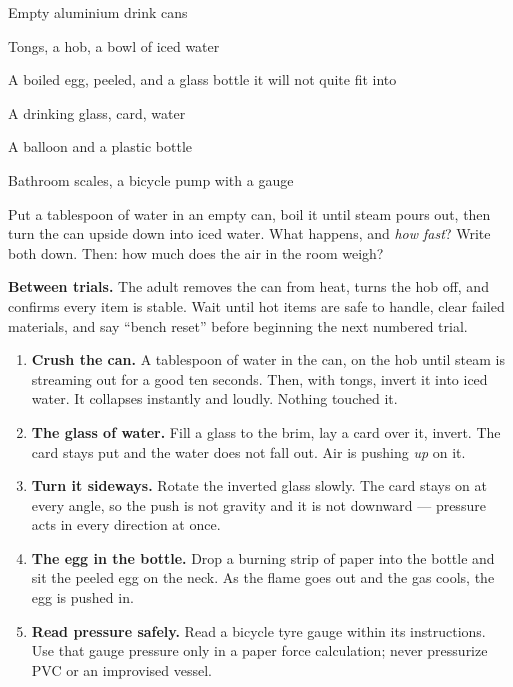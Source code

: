 



\begin{materials}
\item Empty aluminium drink cans
\item Tongs, a hob, a bowl of iced water
\item A boiled egg, peeled, and a glass bottle it will not quite fit into
\item A drinking glass, card, water
\item A balloon and a plastic bottle
\item Bathroom scales, a bicycle pump with a gauge
\end{materials}

\begin{predict}
Put a tablespoon of water in an empty can, boil it until steam pours out, then
turn the can upside down into iced water. What happens, and \emph{how fast}?
Write both down. Then: how much does the air in the room weigh?
\end{predict}
\airplate

\begin{telosframe}
\textbf{Between trials.} The adult removes the can from heat, turns the hob
off, and confirms every item is stable. Wait until hot items are safe to
handle, clear failed materials, and say ``bench reset'' before beginning the
next numbered trial.
\end{telosframe}
\begin{enumerate}
\item \textbf{Crush the can.} A tablespoon of water in the can, on the hob until steam is streaming out for a good ten seconds. Then, with tongs, invert it into iced water. It collapses instantly and loudly. Nothing touched it.
\item \textbf{The glass of water.} Fill a glass to the brim, lay a card over it, invert. The card stays put and the water does not fall out. Air is pushing \emph{up} on it.
\item \textbf{Turn it sideways.} Rotate the inverted glass slowly. The card stays on at every angle, so the push is not gravity and it is not downward --- pressure acts in every direction at once.
\item \textbf{The egg in the bottle.} Drop a burning strip of paper into the bottle and sit the peeled egg on the neck. As the flame goes out and the gas cools, the egg is pushed in.
\item \textbf{Read pressure safely.} Read a bicycle tyre gauge within its
instructions. Use that gauge pressure only in a paper force calculation; never
pressurize PVC or an improvised vessel.
\end{enumerate}

